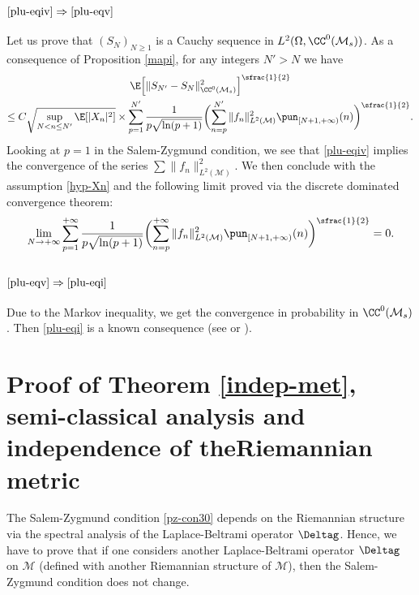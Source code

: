 \subsubsection*{$\eqref{plu-eqiv}\Rightarrow\eqref{plu-eqv}$}
Let us prove that $(S_N)_{N\geq 1}$ is a Cauchy sequence in $L^2(\Omega,\CC^0(\mathcal{M}_s))$.
As a consequence of Proposition \ref{mapi}, for any integers $N'>N$ we have
\begin{multline*}
\E \Bigl[\|S_{N'}-S_N\|_{\CC^0(\mathcal{M}_s)}^2 \Bigr]^{\sfrac{1}{2}} \\
\leq
C \sqrt{\sup_{N< n\leq N'}\E[|X_n|^2]} \times \sum_{p=1}^{N'} \frac{1}{p\sqrt{\ln(p+1)}} \biggl(\sum_{n=p}^{N'} \|f_n\|_{L^2(\mathcal{M})}^2 \pun_{[N+1,+\infty)}(n)\biggr)^{\sfrac{1}{2}}.
\end{multline*}
Looking at $p=1$ in the Salem-Zygmund condition, we see that \eqref{plu-eqiv} implies the convergence of the series $\sum \|f_n\|_{L^2(\mathcal{M})}^2$.
We then conclude with the assumption \eqref{hyp-Xn} and the following limit
proved via the discrete dominated convergence theorem:
\begin{equation*}
\lim_{N\to +\infty}\sum_{p=1}^{+\infty} \frac{1}{p\sqrt{\ln(p+1)}} \biggl(\sum_{n=p}^{+\infty} \|f_n\|_{L^2(\mathcal{M})}^2 \pun_{[N+1,+\infty)}(n) \biggr)^{\sfrac{1}{2}}=0.
\end{equation*}

\subsubsection*{$\eqref{plu-eqv}\Rightarrow\eqref{plu-eqi}$}
Due to the Markov inequality, we get the convergence in probability in $\CC^0(\mathcal{M}_s)$. Then \eqref{plu-eqi} is a known consequence (see \cite[Th.\,6.1]{ledoux} or \cite[p.\,130--131, Th.\,III.3]{queff1}).

\section{Proof of Theorem \ref{indep-met}, semi-classical analysis and independence of the\nobreakspace Riemannian metric}\label{s-wrt}

The Salem-Zygmund condition \eqref{pz-con30} depends on the Riemannian structure via the spectral analysis of the Laplace-Beltrami operator $\Deltag$.
Hence, we have to prove that if one considers another Laplace-Beltrami operator $\Deltag$ on $\mathcal{M}$ (defined with another Riemannian structure of $\mathcal{M}$), then the Salem-Zygmund condition does not change.

